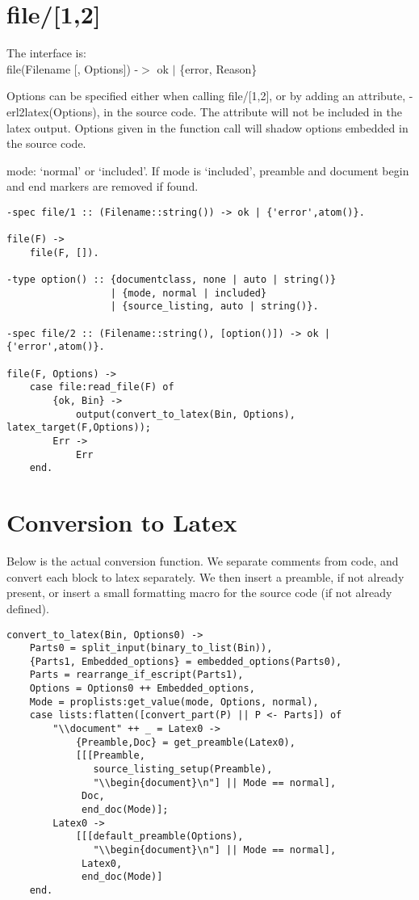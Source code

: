 \documentclass[a4paper,12pt]{article}
\newenvironment{mylisting}
{\begin{list}{}{\setlength{\leftmargin}{1em}}\item\scriptsize\bfseries}
{\end{list}}
\begin{document}
\section{file/[1,2]}

The interface is:\\
file(Filename [, Options]) -$>$ ok $|$ \{error, Reason\}

Options can be specified either when calling file/[1,2], or 
by adding an attribute, -erl2latex(Options), in the source code.
The attribute will not be included in the latex output.
Options given in the function call will shadow options embedded in
the source code.

mode: `normal' or `included'. 
If mode is `included', preamble and document 
begin and end markers are removed if found.
\begin{mylisting}
\begin{verbatim}
-spec file/1 :: (Filename::string()) -> ok | {'error',atom()}.

file(F) ->
    file(F, []).

-type option() :: {documentclass, none | auto | string()}
                  | {mode, normal | included}
                  | {source_listing, auto | string()}.

-spec file/2 :: (Filename::string(), [option()]) -> ok | {'error',atom()}.

file(F, Options) ->
    case file:read_file(F) of
        {ok, Bin} ->
            output(convert_to_latex(Bin, Options), latex_target(F,Options));
        Err ->
            Err
    end.
\end{verbatim}
\end{mylisting}

\section{Conversion to Latex}
Below is the actual conversion function. We separate comments from code,
and convert each block to latex separately. We then insert a preamble,
if not already present, or insert a small formatting macro for the 
source code (if not already defined).
\begin{mylisting}
\begin{verbatim}
convert_to_latex(Bin, Options0) ->
    Parts0 = split_input(binary_to_list(Bin)),
    {Parts1, Embedded_options} = embedded_options(Parts0),
    Parts = rearrange_if_escript(Parts1),
    Options = Options0 ++ Embedded_options,
    Mode = proplists:get_value(mode, Options, normal),
    case lists:flatten([convert_part(P) || P <- Parts]) of
        "\\document" ++ _ = Latex0 ->
            {Preamble,Doc} = get_preamble(Latex0),
            [[[Preamble,
               source_listing_setup(Preamble),
               "\\begin{document}\n"] || Mode == normal],
             Doc,
             end_doc(Mode)];
        Latex0 ->
            [[[default_preamble(Options),
               "\\begin{document}\n"] || Mode == normal],
             Latex0,
             end_doc(Mode)]
    end.
\end{verbatim}
\end{mylisting}
\end{document}
